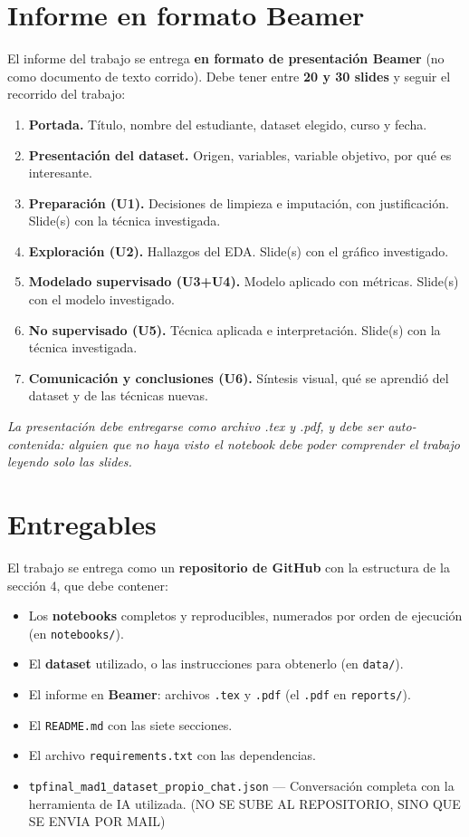 \documentclass[11pt,a4paper]{article}
\newcommand{\codigo}[1]{\texttt{#1}}
\begin{document}
\section{Informe en formato Beamer}
El informe del trabajo se entrega \textbf{en formato de presentaci\'on Beamer} (no como documento de texto corrido). Debe tener entre \textbf{20 y 30 slides} y seguir el recorrido del trabajo:
\begin{enumerate}[leftmargin=2em,itemsep=3pt]
    \item \textbf{Portada.} T\'itulo, nombre del estudiante, dataset elegido, curso y fecha.
    \item \textbf{Presentaci\'on del dataset.} Origen, variables, variable objetivo, por qu\'e es interesante.
    \item \textbf{Preparaci\'on (U1).} Decisiones de limpieza e imputaci\'on, con justificaci\'on. Slide(s) con la t\'ecnica investigada.
    \item \textbf{Exploraci\'on (U2).} Hallazgos del EDA. Slide(s) con el gr\'afico investigado.
    \item \textbf{Modelado supervisado (U3+U4).} Modelo aplicado con m\'etricas. Slide(s) con el modelo investigado.
    \item \textbf{No supervisado (U5).} T\'ecnica aplicada e interpretaci\'on. Slide(s) con la t\'ecnica investigada.
    \item \textbf{Comunicaci\'on y conclusiones (U6).} S\'intesis visual, qu\'e se aprendi\'o del dataset y de las t\'ecnicas nuevas.
\end{enumerate}
\textit{La presentaci\'on debe entregarse como archivo .tex y .pdf, y debe ser auto-contenida: alguien que no haya visto el notebook debe poder comprender el trabajo leyendo solo las slides.}

\section{Entregables}
El trabajo se entrega como un \textbf{repositorio de GitHub} con la estructura de la secci\'on 4, que debe contener:
\begin{itemize}[leftmargin=2em,itemsep=2pt]
    \item Los \textbf{notebooks} completos y reproducibles, numerados por orden de ejecuci\'on (en \codigo{notebooks/}).
    \item El \textbf{dataset} utilizado, o las instrucciones para obtenerlo (en \codigo{data/}).
    \item El informe en \textbf{Beamer}: archivos \codigo{.tex} y \codigo{.pdf} (el \codigo{.pdf} en \codigo{reports/}).
    \item El \codigo{README.md} con las siete secciones.
    \item El archivo \codigo{requirements.txt} con las dependencias.
    \item \codigo{tpfinal\_mad1\_dataset\_propio\_chat.json} --- Conversaci\'on completa con la herramienta de IA utilizada. (NO SE SUBE AL REPOSITORIO, SINO QUE SE ENVIA POR MAIL)
\end{itemize}
\end{document}
